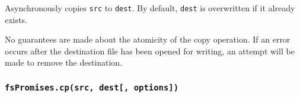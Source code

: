 Asynchronously copies \texttt{src} to \texttt{dest}. By default,
\texttt{dest} is overwritten if it already exists.

No guarantees are made about the atomicity of the copy operation. If an
error occurs after the destination file has been opened for writing, an
attempt will be made to remove the destination.

\begin{Shaded}
\begin{Highlighting}[]
\OperatorTok{,} \OperatorTok{;}

\NormalTok{ \{}
   \NormalTok{(}\OperatorTok{,} \NormalTok{)}\OperatorTok{;}
  \NormalTok{(}\NormalTok{)}\OperatorTok{;}
\NormalTok{\} }\NormalTok{ \{}
  \NormalTok{(}\NormalTok{)}\OperatorTok{;}
\NormalTok{\}}

\NormalTok{ \{}
   \NormalTok{(}\OperatorTok{,} \OperatorTok{,}\NormalTok{)}\OperatorTok{;}
  \NormalTok{(}\NormalTok{)}\OperatorTok{;}
\NormalTok{\} }\NormalTok{ \{}
  \NormalTok{(}\NormalTok{)}\OperatorTok{;}
\NormalTok{\}}
\end{Highlighting}
\end{Shaded}

\subsubsection{\texorpdfstring{\texttt{fsPromises.cp(src,\ dest{[},\ options{]})}}{fsPromises.cp(src, dest{[}, options{]})}}\label{fspromises.cpsrc-dest-options}

